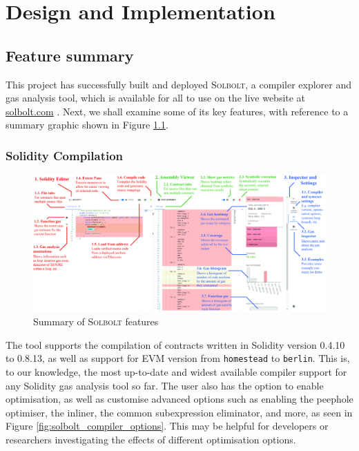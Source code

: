 \chapter{Design and Implementation}
\label{chap:implementation}


\section{Feature summary}
This project has successfully built and deployed \textcolor{NavyBlue}{\textsc{Solbolt}}, a compiler explorer and gas analysis tool,
which is available for all to use on the live website at \href{https://www.solbolt.com}{\textcolor{NavyBlue}{solbolt.com}} \cite{solbolt}. Next, we shall examine some of its
key features, with reference to a summary graphic shown in Figure \ref{fig:solbolt_summary}.

\subsection{Solidity Compilation}

\begin{figure}
  \centering
  \includegraphics[width=\textwidth]{./figures/implementation/summary}
  \caption{Summary of \textcolor{NavyBlue}{\textsc{Solbolt}} features}
  \label{fig:solbolt_summary}
\end{figure}

The tool supports the compilation of contracts written in Solidity version 0.4.10 to 0.8.13,
as well as support for EVM version from \texttt{homestead} to \texttt{berlin}. This is, to
our knowledge, the most up-to-date and widest available compiler support for any 
Solidity gas analysis tool so far. The user also has the option to enable optimisation, as
well as customise advanced options such as enabling the peephole optimiser, the inliner,
the common subexpression eliminator, and more, as seen in Figure \ref{fig:solbolt_compiler_options}. This may be helpful for developers or
researchers investigating the effects of different optimisation options.

